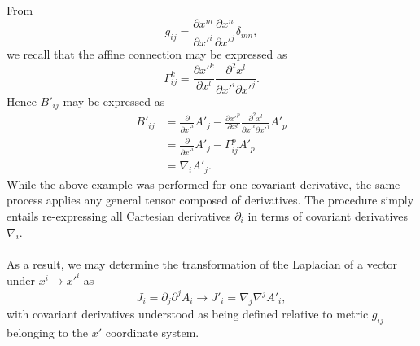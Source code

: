 \documentclass[10pt,letterpaper]{article}
\begin{document}
From 
\begin{equation}
g_{ij} = \frac{\partial x^m}{\partial x'^i}\frac{\partial x^n}{\partial x'^j}\delta_{mn},
\end{equation}
we recall that the affine connection may be expressed as
\begin{equation}
\Gamma^{k}_{ij} = \frac{\partial x'^k}{\partial x^l} \frac{\partial^2 x^l}{\partial x'^i \partial x'^j}.
\end{equation}
Hence $B'_{ij}$ may be expressed as
\begin{align*}
B'_{ij} &=  \frac{\partial}{\partial x'^i}A'_j - \frac{\partial x'^p}{\partial x^l} \frac{\partial^2 x^l}{\partial x'^i \partial x'^j} A'_p\\
&=  \frac{\partial}{\partial x'^i}A'_j -\Gamma^p_{ij} A'_p\\
&= \nabla_i A'_j.
\end{align*}
While the above example was performed for one covariant derivative, the same process applies any general tensor composed of derivatives. The procedure simply entails re-expressing all Cartesian derivatives $\partial_i$ in terms of covariant derivatives $\nabla_i$. 
\\ \\
As a result, we may determine the transformation of the Laplacian of a vector under $x^i\to x'^i$ as
\begin{equation}
J_i = \partial_j \partial^j A_i \to J'_i = \nabla_j \nabla^j A'_i,
\end{equation}
with covariant derivatives understood as being defined relative to metric $g_{ij}$ belonging to the $x'$ coordinate system. 
\\ \\
\end{document}

